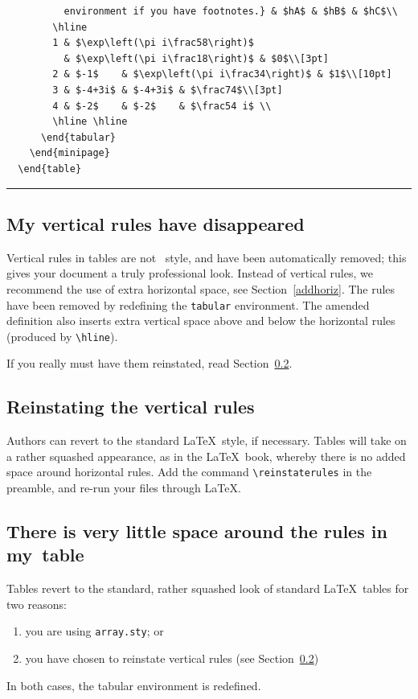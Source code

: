 \begin{table}
\begin{verbatim}
          environment if you have footnotes.} & $hA$ & $hB$ & $hC$\\
        \hline
        1 & $\exp\left(\pi i\frac58\right)$
          & $\exp\left(\pi i\frac18\right)$ & $0$\\[3pt]
        2 & $-1$    & $\exp\left(\pi i\frac34\right)$ & $1$\\[10pt]
        3 & $-4+3i$ & $-4+3i$ & $\frac74$\\[3pt]
        4 & $-2$    & $-2$    & $\frac54 i$ \\
        \hline \hline
      \end{tabular}
    \end{minipage}
  \end{table}
\end{verbatim}
\rule[20pt]{\textwidth}{0.5pt}
  \end{table}

\subsection{My vertical rules have disappeared}

Vertical rules in tables are not \cambridge\ style, and have been automatically removed; this gives your document a truly professional look. Instead of vertical rules, we recommend the use of extra horizontal space, see Section~\ref{addhoriz}. The rules have been removed by redefining the \verb"tabular" environment. The amended definition also inserts extra vertical space above and below the horizontal rules (produced by \verb"\hline").

If you really must have them reinstated, read Section~\ref{reinstate}.

\subsection{Reinstating the vertical rules}
\label{reinstate}
Authors can revert to the standard \LaTeX\ style, if necessary. Tables will take on a rather squashed appearance, as in the \LaTeX\ book, whereby there is no added space around horizontal rules. Add the command \verb"\reinstaterules" in the preamble, and re-run your files through \LaTeX.

\subsection{There is very little space around the rules in my~table}
Tables revert to the standard, rather squashed look of standard \LaTeX\ tables for two reasons:
\begin{enumerate}
  \item you are using \verb"array.sty"; or
  \item you have chosen to reinstate vertical rules (see Section~\ref{reinstate})
\end{enumerate}
In both cases, the tabular environment is redefined.


